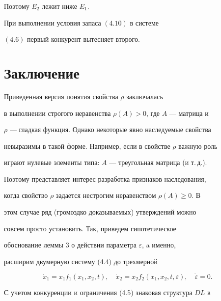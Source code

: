 Поэтому $E_2$ лежит ниже $E_1$. 


 


\begin{thm} 


При выполнении условия запаса $(4.10)$ в системе 


$(4.6)$ первый конкурент вытесняет второго. 


\end{thm} 


 


\section*{Заключение} 


 


Приведенная версия понятия свойства $\rho$ заключалась 


в выполнении строгого неравенства $\rho(A)>0$, где $A$ --- матрица и 


$\rho$ --- гладкая функция. Однако некоторые явно наследуемые свойства 


невыразимы в такой форме. Например, если в свойстве $\rho$ важную роль 


играют нулевые элементы типа: $A$ --- треугольная матрица (и т.\,д.). 


 


Поэтому представляет интерес разработка признаков наследования, 


когда свойство $\rho$ задается нестрогим неравенством $\rho(A)\ge0$. В 


этом случае ряд (громоздко доказываемых) утверждений можно


совсем просто установить. Так, приведем гипотетическое 


обоснование леммы 3 о действии параметра $\varepsilon$, a именно, 


расширим двумерную систему (4.4) до трехмерной 


$$ 


\Dot x_1=x_1f_1(x_1,x_2,t),\quad 


\Dot x_2=x_2f_2(x_1,x_2,t,\varepsilon),\quad 


\Dot\varepsilon=0. 


$$ 


С учетом конкуренции и ограничения (4.5) знаковая структура $D L$ в 


